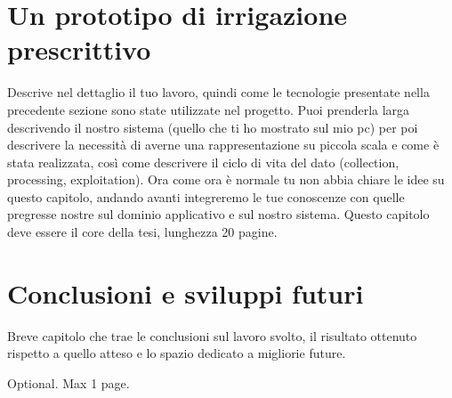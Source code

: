 \documentclass[12pt,a4paper,openright,twoside]{book}
\begin{document}
\chapter{Un prototipo di irrigazione prescrittivo}
Descrive nel dettaglio il tuo lavoro, quindi come le tecnologie presentate nella precedente sezione sono state utilizzate nel progetto. Puoi prenderla larga descrivendo il nostro sistema (quello che ti ho mostrato sul mio pc) per poi descrivere la necessità di averne una rappresentazione su piccola scala e come è stata realizzata, così come descrivere il ciclo di vita del dato (collection, processing, exploitation). Ora come ora è normale tu non abbia chiare le idee su questo capitolo, andando avanti integreremo le tue conoscenze con quelle pregresse nostre sul dominio applicativo e sul nostro sistema. Questo capitolo deve essere il core della tesi, lunghezza 20 pagine.

\chapter{Conclusioni e sviluppi futuri}

Breve capitolo che trae le conclusioni sul lavoro svolto, il risultato ottenuto rispetto a quello atteso e lo spazio dedicato a migliorie future.

%
%

\backmatter

\nocite{*} %




\begin{acknowledgements} %
    Optional. Max 1 page.
\end{acknowledgements}
\end{document}
